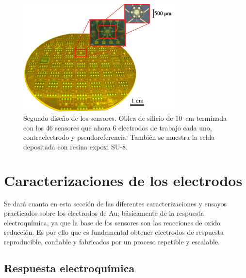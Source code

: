 					  \begin{figure}[ht!]
					  \begin{center}
					  \includegraphics[width=0.75\textwidth]{Imagenes/ObleaV2.jpg}
					  \caption[Electrodos, segunda versión]{Segundo diseño de los sensores. Oblea de silicio de \SI{10}{cm} terminada con los 46 sensores que ahora 6 electrodos de trabajo cada uno, contraelectrodo y pseudoreferencia. También se muestra la celda depositada con resina expoxi SU-8.}
					  \label{fig:ObleaV2}
					  \end{center}
					  \end{figure} 	
		
\section{Caracterizaciones de los electrodos}

		Se dará cuanta en esta sección de las diferentes caracterizaciones y ensayos practicados sobre los electrodos de Au; básicamente de la respuesta electroquímica, ya que la base de los sensores son las reacciones de oxido reducción. Es por ello que es fundamental obtener electrodos de respuesta reproducible, confiable y fabricados por un proceso repetible y escalable. 

	\subsection{Respuesta electroquímica}
			 		

